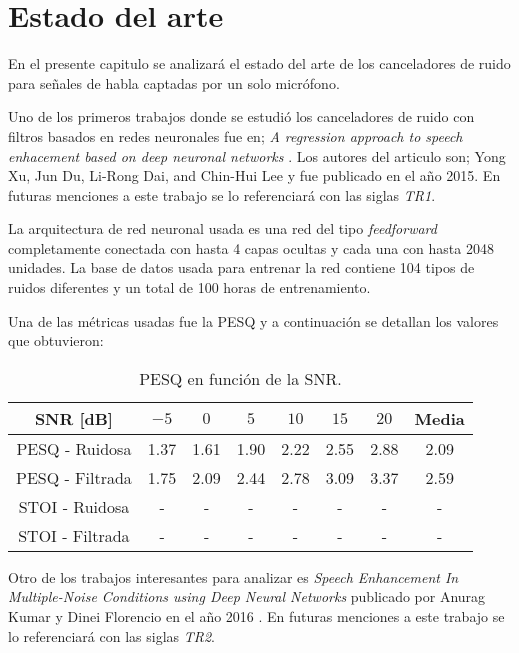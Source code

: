 \section{Estado del arte}
\label{sec:estado_del_arte}

En el presente capitulo se analizará el estado del arte de los canceladores de ruido para señales de habla captadas por un solo micrófono.

Uno de los primeros trabajos donde se estudió los canceladores de ruido con filtros basados en redes neuronales fue en; \emph{A regression approach to speech enhacement based on deep neuronal networks} \cite{a_regression_approach_to_speech_enhancement_based_on_deep_neural_networks}. Los autores del articulo son; Yong Xu, Jun Du, Li-Rong Dai, and Chin-Hui Lee y fue publicado en el año 2015. En futuras menciones a este trabajo se lo referenciará con las siglas \emph{TR1}.

La arquitectura de red neuronal usada es una red del tipo \emph{feedforward} completamente conectada con hasta 4 capas ocultas y cada una con hasta 2048 unidades. La base de datos usada para entrenar la red contiene 104 tipos de ruidos diferentes y un total de 100 horas de entrenamiento.

Una de las métricas usadas fue la PESQ y a continuación se detallan los valores que obtuvieron:

\begin{table}[H]
	\centering
	\begin{tabular}{ |c|c|c|c|c|c|c|c| } 
		\hline
		SNR [dB] & $-5$ & $0$ & $5$ & $10$ & $15$ & $20$ & Media \\ 
		\hline
		PESQ - Ruidosa & 1.37 & 1.61 & 1.90 & 2.22 & 2.55 & 2.88 & 2.09 \\
		PESQ - Filtrada & 1.75 & 2.09 & 2.44 & 2.78 & 3.09 & 3.37 & 2.59 \\
		\hline
		STOI - Ruidosa & - & - & - & - & - & - & - \\
		STOI - Filtrada & - & - & - & - & - & - & - \\
		\hline
	\end{tabular}
	\caption{PESQ en función de la SNR.}
\end{table}

Otro de los trabajos interesantes para analizar es \emph{Speech Enhancement In Multiple-Noise Conditions using Deep Neural Networks} publicado por Anurag Kumar y Dinei Florencio en el año 2016 \cite{speech_enhancement_in_multiple_moise_conditions_using_deep_neural_networks}. En futuras menciones a este trabajo se lo referenciará con las siglas \emph{TR2}.


